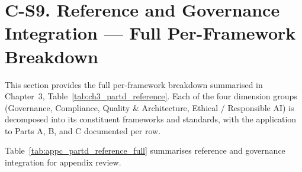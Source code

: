 \section*{C-S9. Reference and Governance Integration --- Full Per-Framework Breakdown}
\label{sec:appc_partd_reference_full}

\noindent This section provides the full per-framework breakdown summarised in Chapter~3, Table~\ref{tab:ch3_partd_reference}. Each of the four dimension groups (Governance, Compliance, Quality \& Architecture, Ethical / Responsible AI) is decomposed into its constituent frameworks and standards, with the application to Parts A, B, and C documented per row.

\noindent Table~\ref{tab:appc_partd_reference_full} summarises reference and governance integration for appendix review.

